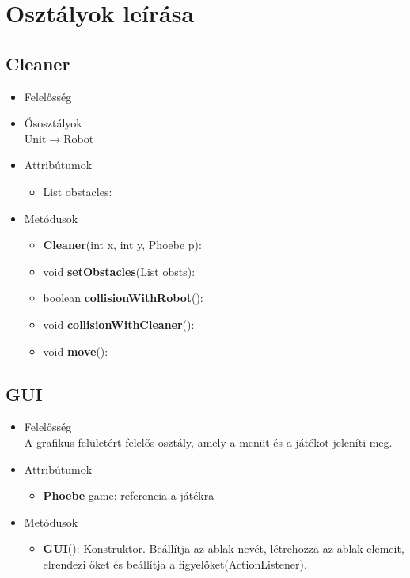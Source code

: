 \section{Osztályok leírása}

\subsection{Cleaner}
\begin{itemize}
\item Felelősség\\

\item Ősosztályok\\
Unit$\rightarrow$Robot
\item Attribútumok
    \begin{itemize}
        \item List obstacles:  
    \end{itemize}
\item Metódusok
	\begin{itemize}
	    \item \textbf{Cleaner}(int x, int y, Phoebe p):
		\item void \textbf{setObstacles}(List obsts): 
		\item boolean \textbf{collisionWithRobot}():
		\item void \textbf{collisionWithCleaner}():
		\item void \textbf{move}():
	\end{itemize}
\end{itemize}



\subsection{GUI}
\begin{itemize}
\item Felelősség\\
A grafikus felületért felelős osztály, amely a menüt és a játékot jeleníti meg.
\item Attribútumok
	\begin{itemize}
		\item \textbf{Phoebe} game: referencia a játékra
	\end{itemize}
\item Metódusok
	\begin{itemize}
		\item\textbf{GUI}(): Konstruktor. Beállítja az ablak nevét, létrehozza az ablak elemeit, elrendezi őket és beállítja a figyelőket(ActionListener).
	\end{itemize}
\end{itemize}

